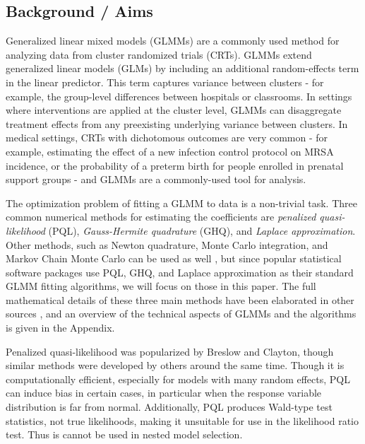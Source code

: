 \documentclass{article}
\begin{document}
\newpage

\begin{flushleft}
\section{Background / Aims}

Generalized linear mixed models (GLMMs) are a commonly used method for analyzing data from cluster randomized trials (CRTs). GLMMs extend generalized linear models (GLMs) by including an additional random-effects term in the linear predictor. This term captures variance between clusters - for example, the group-level differences between hospitals or classrooms. In settings where interventions are applied at the cluster level, GLMMs can disaggregate treatment effects from any preexisting underlying variance between clusters. In medical settings, CRTs with dichotomous outcomes are very common - for example, estimating the effect of a new infection control protocol on MRSA incidence, or the probability of a preterm birth for people enrolled in prenatal support groups - and GLMMs are a commonly-used tool for analysis. 

The optimization problem of fitting a GLMM to data is a non-trivial task. Three common numerical methods for estimating the coefficients are \textit{penalized quasi-likelihood} (PQL), \textit{Gauss-Hermite quadrature} (GHQ), and \textit{Laplace approximation}. Other methods, such as Newton quadrature, Monte Carlo integration, and Markov Chain Monte Carlo can be used as well \cite{zhang_fitting_2011}, but since popular statistical software packages use PQL, GHQ, and Laplace approximation as their standard GLMM fitting algorithms, we will focus on those in this paper. The full mathematical details of these three main methods have been elaborated in other sources \cite{wolfinger_generalized_1993}\cite{pinheiro_efficient_2006}, and an overview of the technical aspects of GLMMs and the algorithms is given in the Appendix.

Penalized quasi-likelihood was popularized by Breslow and Clayton\cite{breslow_approximate_1993}, though similar methods were developed by others\cite{zeger_models_1988}\cite{engel_simple_1994} around the same time. Though it is computationally efficient, especially for models with many random effects, PQL can induce bias in certain cases, in particular when the response variable distribution is far from normal\cite{agresti_categorical_2013}\cite{rodriguez_assessment_1995}\cite{breslow_bias_1995}\cite{lin_bias_1996}. Additionally, PQL produces Wald-type test statistics, not true likelihoods, making it unsuitable for use in the likelihood ratio test.  Thus is cannot be used in nested model selection\cite{zhang_fitting_2011}\cite{pinheiro_efficient_2006}\cite{ng_estimation_2006}.


\end{flushleft}
\end{document}

